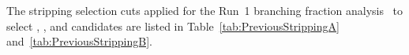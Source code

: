 The stripping selection cuts applied for the Run~1 branching fraction analysis~\cite{CMS:2014xfa, Aaij:2013aka} to select \bmumu, \bujpsik, \bsjpsiphi and \bhh candidates are listed in Table~\ref{tab:PreviousStrippingA} and~\ref{tab:PreviousStrippingB}.

